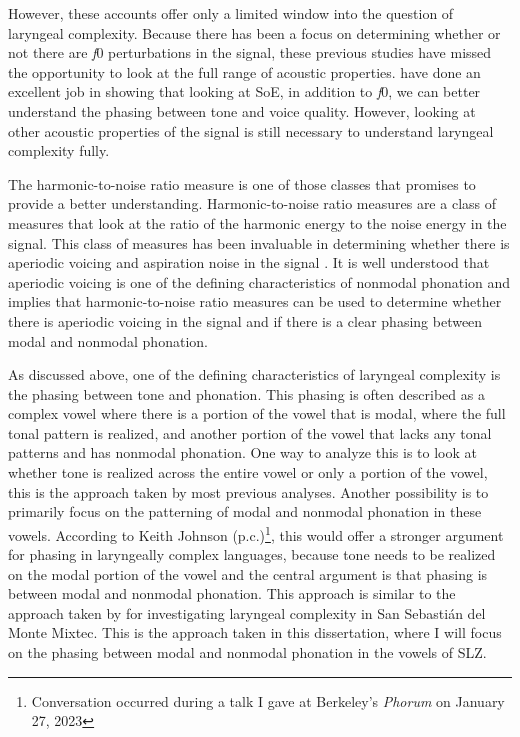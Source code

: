 However, these accounts offer only a limited window into the question of laryngeal complexity. Because there has been a focus on determining whether or not there are \textit{f}0 perturbations in the signal, these previous studies have missed the opportunity to look at the full range of acoustic properties. \citet{wellerInteractionsToneGlottalization2023,wellerLexicalToneVowel2023,wellerVoiceQualityTone2024} have done an excellent job in showing that looking at SoE, in addition to \textit{f}0, we can better understand the phasing between tone and voice quality. However, looking at other acoustic properties of the signal is still necessary to understand laryngeal complexity fully. 

The harmonic-to-noise ratio measure is one of those classes that promises to provide a better understanding. Harmonic-to-noise ratio measures are a class of measures that look at the ratio of the harmonic energy to the noise energy in the signal. This class of measures has been invaluable in determining whether there is aperiodic voicing and aspiration noise in the signal \citep{dekromCepstrumBasedTechniqueDetermining1993,ferrerriesgoWhatMakesCepstral2020,garellekPhoneticsVoice2019}. It is well understood that aperiodic voicing is one of the defining characteristics of nonmodal phonation \citep{ladefogedSoundsWorldsLanguages1996} and implies that harmonic-to-noise ratio measures can be used to determine whether there is aperiodic voicing in the signal and if there is a clear phasing between modal and nonmodal phonation.

As discussed above, one of the defining characteristics of laryngeal complexity is the phasing between tone and phonation. This phasing is often described as a complex vowel where there is a portion of the vowel that is modal, where the full tonal pattern is realized, and another portion of the vowel that lacks any tonal patterns and has nonmodal phonation. One way to analyze this is to look at whether tone is realized across the entire vowel or only a portion of the vowel, this is the approach taken by most previous analyses. Another possibility is to primarily focus on the patterning of modal and nonmodal phonation in these vowels. According to Keith Johnson (p.c.)\footnote{Conversation occurred during a talk I gave at Berkeley's \textit{Phorum} on January 27, 2023}, this would offer a stronger argument for phasing in laryngeally complex languages, because tone needs to be realized on the modal portion of the vowel and the central argument is that phasing is between modal and nonmodal phonation. This approach is similar to the approach taken by \citet{wellerInteractionsToneGlottalization2023,wellerLexicalToneVowel2023,wellerVoiceQualityTone2024} for investigating laryngeal complexity in San Sebastián del Monte Mixtec. This is the approach taken in this dissertation, where I will focus on the phasing between modal and nonmodal phonation in the vowels of SLZ. 

